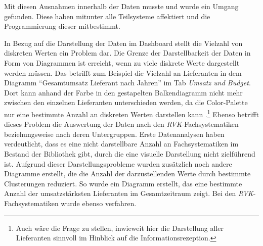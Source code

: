 Mit diesen Ausnahmen innerhalb der Daten musste und wurde ein Umgang gefunden. Diese haben mitunter alle Teilsysteme affektiert und
die Programmierung dieser mitbestimmt.

In Bezug auf die Darstellung der Daten im Dashboard stellt die Vielzahl von diskreten Werten ein Problem dar. 
Die Grenze der Darstellbarkeit der Daten in Form von Diagrammen ist erreicht, wenn zu viele diskrete Werte dargestellt werden müssen.
Das betrifft zum Beispiel die Vielzahl an Lieferanten in dem Diagramm \enquote{Gesamtumsatz Lieferant nach Jahren} im Tab \textit{Umsatz und Budget}. 
Dort kann anhand der Farbe in den gestapelten Balkendiagramm nicht mehr zwischen den einzelnen Lieferanten unterschieden werden, da die Color-Palette 
nur eine bestimmte Anzahl an diskreten Werten darstellen kann \cite[Vgl.][]{plotly_discrete_2021}.\footnote{Auch wäre die Frage zu stellen, inwieweit hier die Darstellung aller Lieferanten sinnvoll im Hinblick auf die Informationsrezeption.}
Ebenso betrifft dieses Problem die Auswertung der Daten nach den \textit{\acrshort{RVK}}-Fachsystematiken beziehungsweise nach deren Untergruppen. 
Erste Datenanalysen haben verdeutlicht, dass es eine nicht darstellbare Anzahl an Fachsystematiken im Bestand der Bibliothek gibt, durch die eine visuelle Darstellung nicht zielführend ist.
Aufgrund dieser Darstellungsprobleme wurden zusätzlich noch andere Diagramme erstellt, die die Anzahl der darzustellenden Werte durch bestimmte Clusterungen reduziert.
So wurde ein Diagramm erstellt, das eine bestimmte Anzahl der umsatzstärksten Lieferanten im Gesamtzeitraum zeigt. Bei den \textit{\acrshort{RVK}}-Fachsystematiken wurde ebenso
verfahren.






